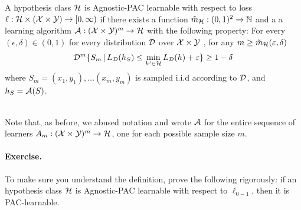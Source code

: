 \begin{definition} \label{apac:def}
    A hypothesis class $\mathcal{H}$ is Agnostic-PAC learnable with respect to
    loss $\ell:\mathcal{H}\times (\mathcal{X}\times \mathcal{Y})\to[0,\infty)$ if there exists a function
    $\tilde{m}_{\mathcal{H}}:(0,1)^2\to\mathbb{N}$  and a
a learning algorithm $\mathcal{A}:(\mathcal{X}\times\mathcal{Y})^m\to\mathcal{H}$
with the following property: For every $(\epsilon,\delta)\in (0, 1)$ 
for every distribution $\mathcal{D}$ over $\mathcal{X}\times \mathcal{Y}$ , for any $m\geq \tilde{m}_{\mathcal{H}}(\varepsilon,\delta)$ 
\[
    \mathcal{D}^m\{ S_m \,|\, L_{\mathcal{D}}(h_S) \leq \min_{h'\in\mathcal{H}} L_{\mathcal{D}}(h) + \varepsilon\} \geq 1-\delta
\]
where $S_m=\left( x_1,y_1 \right),\ldots \left( x_m,y_m \right)$ is sampled
i.i.d according to $\mathcal{D}$, and $h_S=\mathcal{A}(S)$.
\end{definition}
~\\
Note that,  as before, we abused notation and wrote $\mathcal{A}$ for the entire sequence
of learners
$A_m:(\mathcal{X}\times\mathcal{Y})^m\to\mathcal{H}$, one for each possible sample size $m$.



\paragraph{Exercise.} To make sure you understand the definition, prove the
following rigorously: if 
an hypothesis class $\mathcal{H}$ is Agnostic-PAC learnable with respect to $\ell_{0-1}$, then it is PAC-learnable. 

